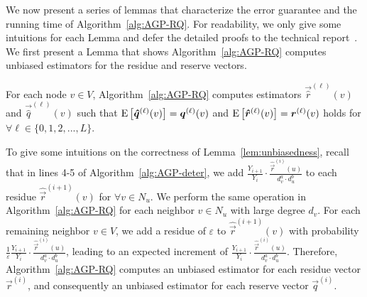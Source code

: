 
 


 We now present a series of lemmas that characterize the error guarantee and the running time of Algorithm~\ref{alg:AGP-RQ}. For readability, we only give some intuitions for each Lemma and defer the detailed proofs to the technical report~\cite{TechnicalReport}.  We first present a Lemma that shows  Algorithm~\ref{alg:AGP-RQ} computes unbiased estimators for the residue and reserve vectors. 

\begin{lemma}
\vspace{-1mm}
	\label{lem:unbiasedness}
	For each node $v\in V$, Algorithm~\ref{alg:AGP-RQ} computes estimators $\vec{\hat{r}}^{(\ell)}(v)$ and $\vec{\hat{q}}^{(\ell)}(v)$ such that $\mathrm{E}\left[ \bm{\hat{q}}^{(\ell)}(v)\right]=\bm{q}^{(\ell)}(v)$ and $\mathrm{E}\left[ \bm{\hat{r}}^{(\ell)}(v)\right]=\bm{r}^{(\ell)}(v)$ holds for $\forall \ell \in \{0,1, 2, ... , L\}$.
\end{lemma}
To give some intuitions on the correctness of Lemma~\ref{lem:unbiasedness}, recall that in lines 4-5 of Algorithm~\ref{alg:AGP-deter}, we add $\frac{Y_{i+1}}{Y_i} \cdot \frac{\hat{\vec{r}}^{(i)}(u)}{d_v^a\cdot d_u^b}$ to each residue $\hat{\vec{r}}^{(i+1)}(v)$ for $\forall v\in N_u$. 
We perform the same operation in Algorithm~\ref{alg:AGP-RQ} for each neighbor $v \in N_u$ with large degree $d_v$. For each remaining neighbor $v\in V$, we add a residue of $ \varepsilon$ to  $\hat{\vec{r}}^{(i+1)}(v)$ with probability $\frac{1}{\varepsilon}\frac{Y_{i+1}}{Y_i} \cdot \frac{\hat{\vec{r}}^{(i)}(u)}{d_v^a\cdot d_u^b}$, leading to an expected increment of $\frac{Y_{i+1}}{Y_i} \cdot \frac{\hat{\vec{r}}^{(i)}(u)}{d_v^a\cdot d_u^b}$. Therefore, Algorithm~\ref{alg:AGP-RQ} computes an unbiased estimator for each residue vector $\vec{r}^{(i)}$, and consequently an unbiased estimator for each reserve vector $\vec{q}^{(i)}$.

